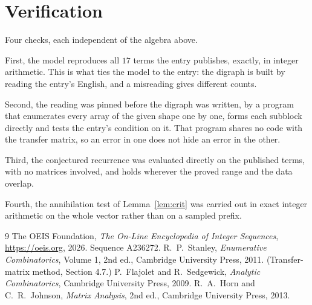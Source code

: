 \documentclass[11pt,a4paper]{article}
\theoremstyle{plain}
\theoremstyle{definition}
\begin{document}
\section{Verification}

Four checks, each independent of the algebra above.

First, the model reproduces all $17$ terms the entry publishes, exactly, in integer
arithmetic. This is what ties the model to the entry: the digraph is built by reading the
entry's English, and a misreading gives different counts.

Second, the reading was pinned before the digraph was written, by a program that enumerates
every array of the given shape one by one, forms each subblock directly and tests the entry's
condition on it. That program shares no code with the transfer matrix, so an error in one does
not hide an error in the other.

Third, the conjectured recurrence was evaluated directly on the published terms, with no
matrices involved, and holds wherever the proved range and the data overlap.

Fourth, the annihilation test of Lemma~\ref{lem:crit} was carried out in exact integer
arithmetic on the whole vector rather than on a sampled prefix.

\begin{thebibliography}{9}
 The OEIS Foundation, \emph{The On-Line Encyclopedia of Integer
Sequences}, \url{https://oeis.org}, 2026. Sequence A236272.
 R.~P.~Stanley, \emph{Enumerative Combinatorics}, Volume 1, 2nd ed.,
Cambridge University Press, 2011. (Transfer-matrix method, Section 4.7.)
 P.~Flajolet and R.~Sedgewick, \emph{Analytic Combinatorics}, Cambridge
University Press, 2009.
 R.~A.~Horn and C.~R.~Johnson, \emph{Matrix Analysis}, 2nd ed., Cambridge
University Press, 2013.
\end{thebibliography}
\end{document}
